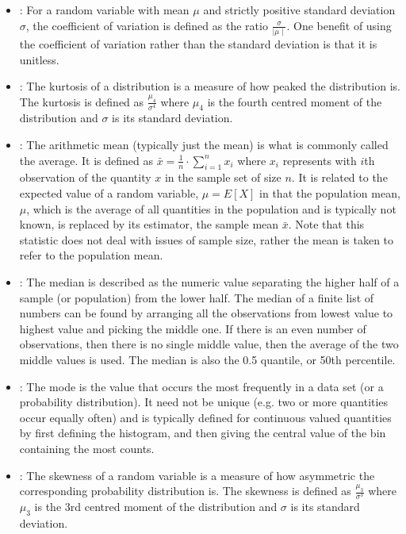 \documentclass[draftspec]{sbmlpkgspec}
\begin{document}
\begin{itemize}

\item {}:  For a random variable with mean $ \mu $ and strictly positive standard deviation $ \sigma $, the coefficient of variation is defined as the ratio $ \frac{\sigma}{\mid\mu\mid} $. One benefit of using the coefficient of variation rather than the standard deviation is that it is unitless.

\item {}:  The kurtosis of a distribution is a measure of how peaked the distribution is. The kurtosis is defined as $  \frac{\mu_4}{\sigma^4} $ where $ \mu_4 $ is the fourth centred moment of the distribution and $ \sigma $ is its standard deviation.

\item {}:  The arithmetic mean (typically just the mean) is what is commonly called the average. It is defined as $ \bar{x} = \frac{1}{n}\cdot \sum_{i=1}^n{x_i} $ where $ x_i $ represents with $ i $th observation of the quantity $ x $ in the sample set of size $ n $. It is related to the expected value of a random variable, $ \mu = E[X] $ in that the population mean, $ \mu $, which is the average of all quantities in the population and is typically not known, is replaced by its estimator, the sample mean $ \bar{x} $. Note that this statistic does not deal with issues of sample size, rather the mean is taken to refer to the population mean.

\item {}:  The median is described as the numeric value separating the higher half of a sample (or population) from the lower half. The median of a finite list of numbers can be found by arranging all the observations from lowest value to highest value and picking the middle one. If there is an even number of observations, then there is no single middle value, then the average of the two middle values is used. The median is also the 0.5 quantile, or 50th percentile.

\item {}:  The mode is the value that occurs the most frequently in a data set (or a probability distribution). It need not be unique (e.g. two or more quantities occur equally often) and is typically defined for continuous valued quantities by first defining the histogram, and then giving the central value of the bin containing the most counts.

\item {}:  The skewness of a random variable is a measure of how asymmetric the corresponding probability distribution is. The skewness is defined as $  \frac{\mu_3}{\sigma^3} $ where $ \mu_3 $ is the 3rd centred moment of the distribution and $ \sigma $ is its standard deviation.


\end{itemize}
\end{document}
